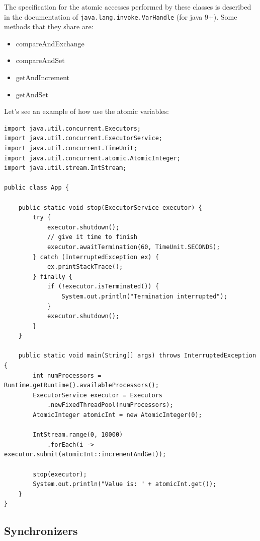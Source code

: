 \documentclass{latex/classes/thesis}
\begin{document}
The specification for the atomic accesses performed by these classes is
described in the documentation of \texttt{java.lang.invoke.VarHandle} (for java
9+). Some methods that they share are:

\begin{itemize}
\item compareAndExchange
\item compareAndSet
\item getAndIncrement
\item getAndSet
\end{itemize}

Let's see an example of how use the atomic variables:

\begin{lstlisting}
import java.util.concurrent.Executors;
import java.util.concurrent.ExecutorService;
import java.util.concurrent.TimeUnit;
import java.util.concurrent.atomic.AtomicInteger;
import java.util.stream.IntStream;

public class App {

    public static void stop(ExecutorService executor) {
        try {
            executor.shutdown();
            // give it time to finish
            executor.awaitTermination(60, TimeUnit.SECONDS);
        } catch (InterruptedException ex) {
            ex.printStackTrace();
        } finally {
            if (!executor.isTerminated()) {
                System.out.println("Termination interrupted");
            }
            executor.shutdown();
        }
    }

    public static void main(String[] args) throws InterruptedException {
        int numProcessors = Runtime.getRuntime().availableProcessors();
        ExecutorService executor = Executors
            .newFixedThreadPool(numProcessors);
        AtomicInteger atomicInt = new AtomicInteger(0);

        IntStream.range(0, 10000)
            .forEach(i -> executor.submit(atomicInt::incrementAndGet));

        stop(executor);
        System.out.println("Value is: " + atomicInt.get());
    }
}
\end{lstlisting}


\subsection{Synchronizers}
\label{sec:org46181c9}
\end{document}
